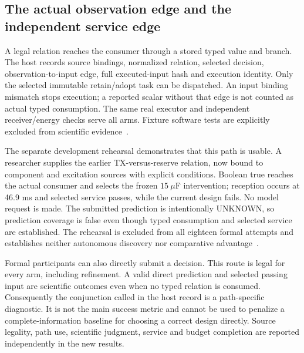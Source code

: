 \subsection{The actual observation edge and the independent service edge}
A legal relation reaches the consumer through a stored typed value and branch.
The host records source bindings, normalized relation, selected decision,
observation-to-input edge, full executed-input hash and execution identity.
Only the selected immutable retain/adopt task can be dispatched. An input
binding mismatch stops execution; a reported scalar without that edge is not
counted as actual typed consumption. The same real executor and independent
receiver/energy checks serve all arms. Fixture software tests are explicitly
excluded from scientific evidence~\cite{abcaudit}.

The separate development rehearsal demonstrates that this path is usable.
A researcher supplies the earlier TX-versus-reserve relation, now bound to
component and excitation sources with explicit conditions. Boolean true reaches
the actual consumer and selects the frozen $15~\mu$F intervention; reception
occurs at 46.9 ms and selected service passes, while the current design fails.
No model request is made. The submitted prediction is intentionally UNKNOWN,
so prediction coverage is false even though typed consumption and selected
service are established. The rehearsal is excluded from all eighteen formal
attempts and establishes neither autonomous discovery nor comparative
advantage~\cite{abcfirst}.

Formal participants can also directly submit a decision. This route is legal
for every arm, including refinement. A valid direct prediction and selected
passing input are scientific outcomes even when no typed relation is consumed.
Consequently the conjunction called  in the
host record is a path-specific diagnostic. It is not the main success metric
and cannot be used to penalize a complete-information baseline for choosing
a correct design directly. Source legality, path use, scientific judgment,
service and budget completion are reported independently in the new results.
\FloatBarrier

